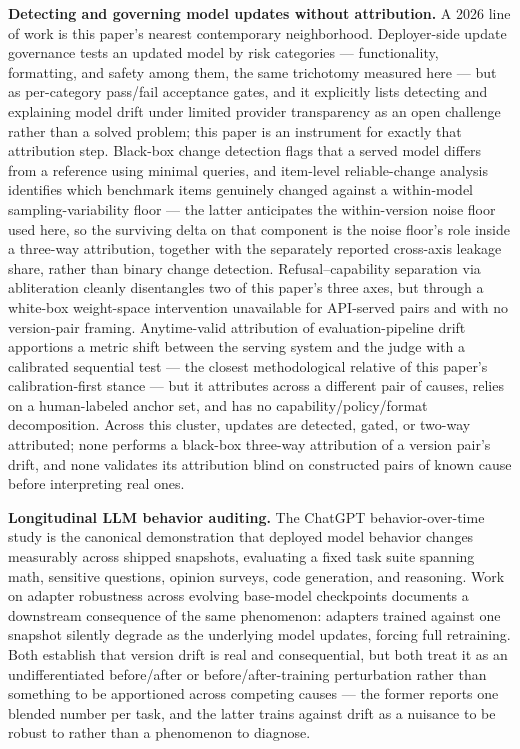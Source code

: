 \documentclass[11pt]{article}
\begin{document}
\textbf{Detecting and governing model updates without attribution.} A 2026 line of work is this paper's nearest contemporary neighborhood. Deployer-side update governance \citep{TestBeforeYouDeploy7789} tests an updated model by risk categories --- functionality, formatting, and safety among them, the same trichotomy measured here --- but as per-category pass/fail acceptance gates, and it explicitly lists detecting and explaining model drift under limited provider transparency as an open challenge rather than a solved problem; this paper is an instrument for exactly that attribution step. Black-box change detection \citep{TokenEfficientChangeDet1083} flags that a served model differs from a reference using minimal queries, and item-level reliable-change analysis \citep{BeyondTheMean7405} identifies which benchmark items genuinely changed against a within-model sampling-variability floor --- the latter anticipates the within-version noise floor used here, so the surviving delta on that component is the noise floor's role inside a three-way attribution, together with the separately reported cross-axis leakage share, rather than binary change detection. Refusal--capability separation via abliteration \citep{WillingButUnable5396} cleanly disentangles two of this paper's three axes, but through a white-box weight-space intervention unavailable for API-served pairs and with no version-pair framing. Anytime-valid attribution of evaluation-pipeline drift \citep{WhoDrifted5474} apportions a metric shift between the serving system and the judge with a calibrated sequential test --- the closest methodological relative of this paper's calibration-first stance --- but it attributes across a different pair of causes, relies on a human-labeled anchor set, and has no capability/policy/format decomposition. Across this cluster, updates are detected, gated, or two-way attributed; none performs a black-box three-way attribution of a version pair's drift, and none validates its attribution blind on constructed pairs of known cause before interpreting real ones.

\textbf{Longitudinal LLM behavior auditing.} The ChatGPT behavior-over-time study \citep{ChatGPTBehavior2307} is the canonical demonstration that deployed model behavior changes measurably across shipped snapshots, evaluating a fixed task suite spanning math, sensitive questions, opinion surveys, code generation, and reasoning. Work on adapter robustness across evolving base-model checkpoints \citep{CARLoRA5Gim} documents a downstream consequence of the same phenomenon: adapters trained against one snapshot silently degrade as the underlying model updates, forcing full retraining. Both establish that version drift is real and consequential, but both treat it as an undifferentiated before/after or before/after-training perturbation rather than something to be apportioned across competing causes --- the former reports one blended number per task, and the latter trains against drift as a nuisance to be robust to rather than a phenomenon to diagnose.
\end{document}

